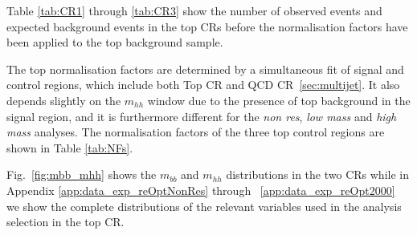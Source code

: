 Table \ref{tab:CR1} through \ref{tab:CR3} show the number of observed
events and expected background events in the top CRs before the
normalisation factors have been applied to the top background sample.

The top normalisation factors are determined by a simultaneous fit  of
signal and control regions, which include both Top CR and QCD CR~\ref{sec:multijet}. It also depends slightly on the $m_{hh}$ window due to the presence of top background in the signal region, and it is furthermore different for the \emph{non  res}, \emph{low  mass} and \emph{high mass} analyses. The normalisation
factors of the three top control regions are shown in Table \ref{tab:NFs}.

Fig.~\ref{fig:mbb_mhh} shows the $m_{bb}$ and $m_{hh}$ distributions in the two CRs while in Appendix \ref{app:data_exp_reOptNonRes} through ~\ref{app:data_exp_reOpt2000} we show the complete distributions of the
relevant variables used in the analysis selection in the top CR.  

